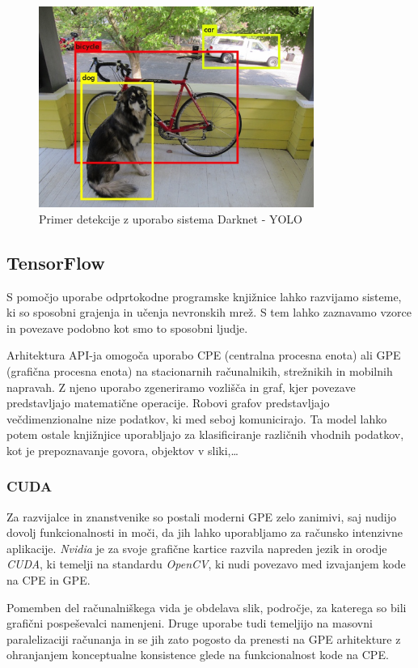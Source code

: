 \documentclass[runningheads,a4paper]{llncs}
\begin{document}
\begin{figure}[H]
\centering
\includegraphics[width=90mm]{figures/darknetExample.png}
\caption{Primer detekcije z uporabo sistema Darknet - YOLO}
\label{fig:darknetExample}
\end{figure}

\subsection{TensorFlow}
S pomočjo uporabe odprtokodne programske knjižnice lahko razvijamo sisteme, ki so sposobni grajenja in učenja nevronskih mrež. S tem lahko zaznavamo vzorce in povezave podobno kot smo to sposobni ljudje.

Arhitektura API-ja omogoča uporabo CPE (centralna procesna enota) ali GPE (grafična procesna enota) na stacionarnih računalnikih, strežnikih in mobilnih napravah. Z njeno uporabo zgeneriramo vozlišča in graf, kjer povezave predstavljajo matematične operacije. Robovi grafov predstavljajo večdimenzionalne nize podatkov, ki med seboj komunicirajo. Ta model lahko potem ostale knjižnjice uporabljajo za klasificiranje različnih vhodnih podatkov, kot je prepoznavanje govora, objektov v sliki,…

\subsubsection{CUDA}
Za razvijalce in znanstvenike so postali moderni GPE zelo zanimivi, saj nudijo dovolj funkcionalnosti in moči, da jih lahko uporabljamo za računsko intenzivne aplikacije. \textit{Nvidia} je za svoje grafične kartice razvila napreden jezik in orodje \textit{CUDA}, ki temelji na standardu \textit{OpenCV}, ki nudi povezavo med izvajanjem kode na CPE in GPE.

Pomemben del računalniškega vida je obdelava slik, področje, za katerega so bili grafični pospeševalci namenjeni. Druge uporabe tudi temeljijo na masovni paralelizaciji računanja in se jih zato pogosto da prenesti na GPE arhitekture z ohranjanjem konceptualne konsistence glede na funkcionalnost kode na CPE.
\end{document}
